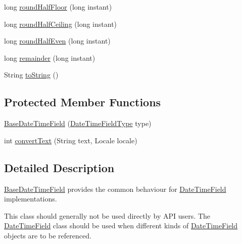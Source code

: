 \begin{DoxyCompactItemize}
\item 
long \hyperlink{classorg_1_1joda_1_1time_1_1field_1_1_base_date_time_field_a98d73f3d61c6754a23ad465010bb0b49}{round\-Half\-Floor} (long instant)
\item 
long \hyperlink{classorg_1_1joda_1_1time_1_1field_1_1_base_date_time_field_ad2cb59eed66386876c0e150750331074}{round\-Half\-Ceiling} (long instant)
\item 
long \hyperlink{classorg_1_1joda_1_1time_1_1field_1_1_base_date_time_field_a82a0b8c2796dad24e4f05d0dc56d2923}{round\-Half\-Even} (long instant)
\item 
long \hyperlink{classorg_1_1joda_1_1time_1_1field_1_1_base_date_time_field_a30b401edc9f2663feebdc79dc18d7578}{remainder} (long instant)
\item 
String \hyperlink{classorg_1_1joda_1_1time_1_1field_1_1_base_date_time_field_a31a07fddd0b9a57b5928d58a8cb991fa}{to\-String} ()
\end{DoxyCompactItemize}
\subsection*{Protected Member Functions}
\begin{DoxyCompactItemize}
\item 
\hyperlink{classorg_1_1joda_1_1time_1_1field_1_1_base_date_time_field_ad4edd065accb0b5923f1a20455b1026b}{Base\-Date\-Time\-Field} (\hyperlink{classorg_1_1joda_1_1time_1_1_date_time_field_type}{Date\-Time\-Field\-Type} type)
\item 
int \hyperlink{classorg_1_1joda_1_1time_1_1field_1_1_base_date_time_field_ac7805e8f31c9ea48409e13d6c99ab568}{convert\-Text} (String text, Locale locale)
\end{DoxyCompactItemize}


\subsection{Detailed Description}
\hyperlink{classorg_1_1joda_1_1time_1_1field_1_1_base_date_time_field}{Base\-Date\-Time\-Field} provides the common behaviour for \hyperlink{classorg_1_1joda_1_1time_1_1_date_time_field}{Date\-Time\-Field} implementations. 

This class should generally not be used directly by A\-P\-I users. The \hyperlink{classorg_1_1joda_1_1time_1_1_date_time_field}{Date\-Time\-Field} class should be used when different kinds of \hyperlink{classorg_1_1joda_1_1time_1_1_date_time_field}{Date\-Time\-Field} objects are to be referenced. 

